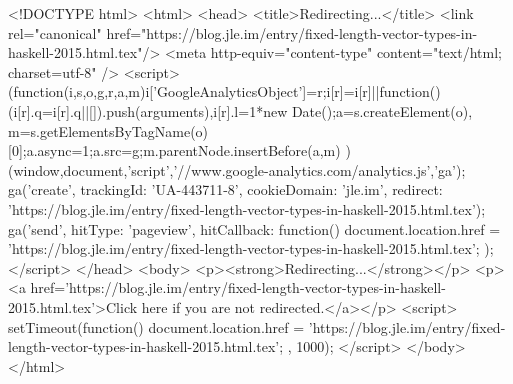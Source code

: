 <!DOCTYPE html>
<html>
<head>
<title>Redirecting...</title>
<link rel="canonical" href="https://blog.jle.im/entry/fixed-length-vector-types-in-haskell-2015.html.tex"/>
<meta http-equiv="content-type" content="text/html; charset=utf-8" />
<script>
(function(i,s,o,g,r,a,m){i['GoogleAnalyticsObject']=r;i[r]=i[r]||function(){
(i[r].q=i[r].q||[]).push(arguments)},i[r].l=1*new Date();a=s.createElement(o),
m=s.getElementsByTagName(o)[0];a.async=1;a.src=g;m.parentNode.insertBefore(a,m)
})(window,document,'script','//www.google-analytics.com/analytics.js','ga');
ga('create', { trackingId: 'UA-443711-8', cookieDomain: 'jle.im', redirect: 'https://blog.jle.im/entry/fixed-length-vector-types-in-haskell-2015.html.tex'});
ga('send', { hitType: 'pageview', hitCallback: function() { document.location.href = 'https://blog.jle.im/entry/fixed-length-vector-types-in-haskell-2015.html.tex'; } });
</script>
</head>
<body>
  <p><strong>Redirecting...</strong></p>
  <p><a href='https://blog.jle.im/entry/fixed-length-vector-types-in-haskell-2015.html.tex'>Click here if you are not redirected.</a></p>
  <script>
    setTimeout(function() { document.location.href = 'https://blog.jle.im/entry/fixed-length-vector-types-in-haskell-2015.html.tex'; }, 1000);
  </script>
</body>
</html>
